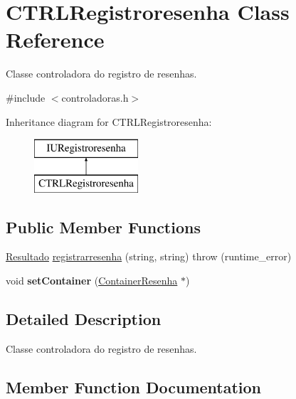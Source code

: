 \hypertarget{classCTRLRegistroresenha}{}\section{C\+T\+R\+L\+Registroresenha Class Reference}
\label{classCTRLRegistroresenha}


Classe controladora do registro de resenhas.  




{\ttfamily \#include $<$controladoras.\+h$>$}

Inheritance diagram for C\+T\+R\+L\+Registroresenha\+:\begin{figure}[H]
\begin{center}
\leavevmode
\includegraphics[height=2.000000cm]{classCTRLRegistroresenha}
\end{center}
\end{figure}
\subsection*{Public Member Functions}
\begin{DoxyCompactItemize}
\item 
\hyperlink{classResultado}{Resultado} \hyperlink{classCTRLRegistroresenha_a7ffdc7e6a667bbf5d93c95659944f621}{registrarresenha} (string, string)  throw (runtime\+\_\+error)
\item 
\mbox{\label{classCTRLRegistroresenha_ac7ee6ec7da046f2b61b138c996f17d45}} 
void {\bfseries set\+Container} (\hyperlink{classContainerResenha}{Container\+Resenha} $\ast$)
\end{DoxyCompactItemize}


\subsection{Detailed Description}
Classe controladora do registro de resenhas. 

\subsection{Member Function Documentation}
\mbox{\label{classCTRLRegistroresenha_a7ffdc7e6a667bbf5d93c95659944f621}} 
